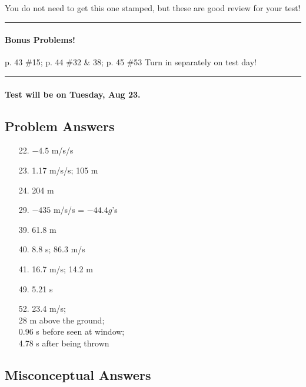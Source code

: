 \documentclass[10pt]{exam}
\begin{document}
{\sc You do not need to get this one stamped,
but these are good review for your test!}

\vspace{1em}
\hrule


\paragraph{Bonus Problems!} p. 43 \#15; p. 44 \#32 \& 38; p. 45 \#53
\dotfill Turn in separately on test day!
  

\vspace{1em}
\hrule


\paragraph{Test will be on Tuesday, Aug 23.} \hfill


\subsection*{Problem Answers}

\begin{multicols}{3}

  \begin{itemize}[noitemsep]
    \item[22.] $-4.5$ m/s/s
    \item[23.] 1.17 m/s/s; 105 m
    \item[24.] 204 m
    \item[29.] $-435$ m/s/s = $-44.4 g$'s
    \item[39.] 61.8 m
    \item[40.] 8.8 s;  86.3 m/s
    \item[41.] 16.7 m/s;  14.2 m
    \item[49.] 5.21 s
    \item[52.] 23.4 m/s; \\ 
               28 m above the ground; \\
               0.96 s before seen at window; \\
               4.78 s after being thrown
    
  \end{itemize}
  
\end{multicols}

\subsection*{Misconceptual Answers}
\end{document}
